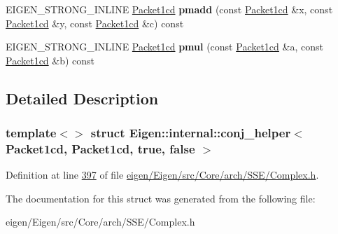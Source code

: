 \begin{DoxyCompactItemize}
E\+I\+G\+E\+N\+\_\+\+S\+T\+R\+O\+N\+G\+\_\+\+I\+N\+L\+I\+NE \hyperlink{struct_eigen_1_1internal_1_1_packet1cd}{Packet1cd} {\bfseries pmadd} (const \hyperlink{struct_eigen_1_1internal_1_1_packet1cd}{Packet1cd} \&x, const \hyperlink{struct_eigen_1_1internal_1_1_packet1cd}{Packet1cd} \&y, const \hyperlink{struct_eigen_1_1internal_1_1_packet1cd}{Packet1cd} \&c) const
\item 
\mbox{\label{struct_eigen_1_1internal_1_1conj__helper_3_01_packet1cd_00_01_packet1cd_00_01true_00_01false_01_4_af4aa2375a7954ed060d41bb27f60445a}} 
E\+I\+G\+E\+N\+\_\+\+S\+T\+R\+O\+N\+G\+\_\+\+I\+N\+L\+I\+NE \hyperlink{struct_eigen_1_1internal_1_1_packet1cd}{Packet1cd} {\bfseries pmul} (const \hyperlink{struct_eigen_1_1internal_1_1_packet1cd}{Packet1cd} \&a, const \hyperlink{struct_eigen_1_1internal_1_1_packet1cd}{Packet1cd} \&b) const
\end{DoxyCompactItemize}


\subsection{Detailed Description}
\subsubsection*{template$<$$>$\newline
struct Eigen\+::internal\+::conj\+\_\+helper$<$ Packet1cd, Packet1cd, true, false $>$}



Definition at line \hyperlink{eigen_2_eigen_2src_2_core_2arch_2_s_s_e_2_complex_8h_source_l00397}{397} of file \hyperlink{eigen_2_eigen_2src_2_core_2arch_2_s_s_e_2_complex_8h_source}{eigen/\+Eigen/src/\+Core/arch/\+S\+S\+E/\+Complex.\+h}.



The documentation for this struct was generated from the following file\+:\begin{DoxyCompactItemize}
\item 
eigen/\+Eigen/src/\+Core/arch/\+S\+S\+E/\+Complex.\+h\end{DoxyCompactItemize}
